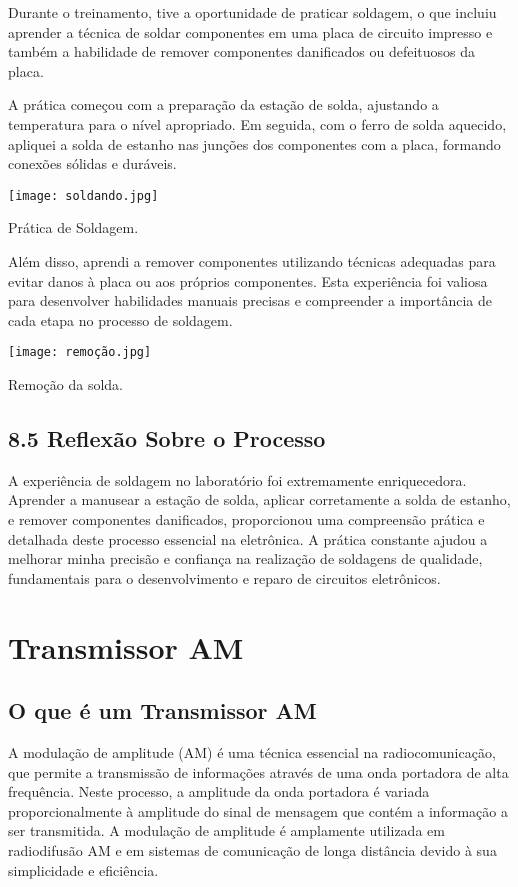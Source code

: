 \documentclass[
]{book}
\begin{document}
Durante o treinamento, tive a oportunidade de praticar soldagem, o que incluiu aprender a técnica de soldar componentes em uma placa de circuito impresso e também a habilidade de remover componentes danificados ou defeituosos da placa.

A prática começou com a preparação da estação de solda, ajustando a temperatura para o nível apropriado. Em seguida, com o ferro de solda aquecido, apliquei a solda de estanho nas junções dos componentes com a placa, formando conexões sólidas e duráveis.

\texttt{[image: soldando.jpg]}

Prática de Soldagem.

Além disso, aprendi a remover componentes utilizando técnicas adequadas para evitar danos à placa ou aos próprios componentes. Esta experiência foi valiosa para desenvolver habilidades manuais precisas e compreender a importância de cada etapa no processo de soldagem.

\texttt{[image: remoção.jpg]}

Remoção da solda.

\section{8.5 Reflexão Sobre o Processo}\label{reflexuxe3o-sobre-o-processo-5}

A experiência de soldagem no laboratório foi extremamente enriquecedora. Aprender a manusear a estação de solda, aplicar corretamente a solda de estanho, e remover componentes danificados, proporcionou uma compreensão prática e detalhada deste processo essencial na eletrônica. A prática constante ajudou a melhorar minha precisão e confiança na realização de soldagens de qualidade, fundamentais para o desenvolvimento e reparo de circuitos eletrônicos.

\chapter{Transmissor AM}\label{transmissor-am}

\section{O que é um Transmissor AM}\label{o-que-uxe9-um-transmissor-am}

A modulação de amplitude (AM) é uma técnica essencial na radiocomunicação, que permite a transmissão de informações através de uma onda portadora de alta frequência. Neste processo, a amplitude da onda portadora é variada proporcionalmente à amplitude do sinal de mensagem que contém a informação a ser transmitida. A modulação de amplitude é amplamente utilizada em radiodifusão AM e em sistemas de comunicação de longa distância devido à sua simplicidade e eficiência.
\end{document}
